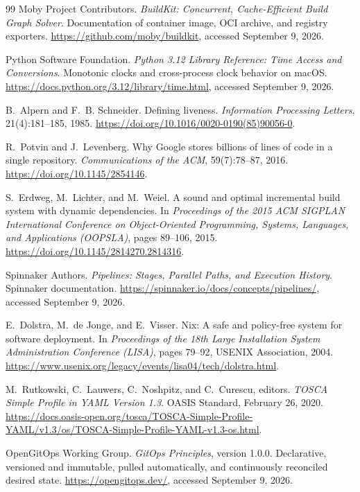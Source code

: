 \begin{thebibliography}{99}
Moby Project Contributors.
\emph{BuildKit: Concurrent, Cache-Efficient Build Graph Solver}.
Documentation of container image, OCI archive, and registry exporters.
\url{https://github.com/moby/buildkit}, accessed September 9, 2026.

Python Software Foundation.
\emph{Python 3.12 Library Reference: Time Access and Conversions}.
Monotonic clocks and cross-process clock behavior on macOS.
\url{https://docs.python.org/3.12/library/time.html}, accessed September 9, 2026.

B.~Alpern and F.~B. Schneider.
Defining liveness.
\emph{Information Processing Letters}, 21(4):181--185, 1985.
\url{https://doi.org/10.1016/0020-0190(85)90056-0}.

R.~Potvin and J.~Levenberg.
Why Google stores billions of lines of code in a single repository.
\emph{Communications of the ACM}, 59(7):78--87, 2016.
\url{https://doi.org/10.1145/2854146}.

S.~Erdweg, M.~Lichter, and M.~Weiel.
A sound and optimal incremental build system with dynamic dependencies.
In \emph{Proceedings of the 2015 ACM SIGPLAN International Conference on
Object-Oriented Programming, Systems, Languages, and Applications (OOPSLA)},
pages 89--106, 2015.
\url{https://doi.org/10.1145/2814270.2814316}.

Spinnaker Authors.
\emph{Pipelines: Stages, Parallel Paths, and Execution History}.
Spinnaker documentation.
\url{https://spinnaker.io/docs/concepts/pipelines/}, accessed September 9, 2026.

E.~Dolstra, M.~de Jonge, and E.~Visser.
Nix: A safe and policy-free system for software deployment.
In \emph{Proceedings of the 18th Large Installation System Administration
Conference (LISA)}, pages 79--92, USENIX Association, 2004.
\url{https://www.usenix.org/legacy/events/lisa04/tech/dolstra.html}.

M.~Rutkowski, C.~Lauwers, C.~Noshpitz, and C.~Curescu, editors.
\emph{TOSCA Simple Profile in YAML Version 1.3}.
OASIS Standard, February 26, 2020.
\url{https://docs.oasis-open.org/tosca/TOSCA-Simple-Profile-YAML/v1.3/os/TOSCA-Simple-Profile-YAML-v1.3-os.html}.

OpenGitOps Working Group.
\emph{GitOps Principles}, version 1.0.0.
Declarative, versioned and immutable, pulled automatically, and continuously
reconciled desired state.
\url{https://opengitops.dev/}, accessed September 9, 2026.


\end{thebibliography}
